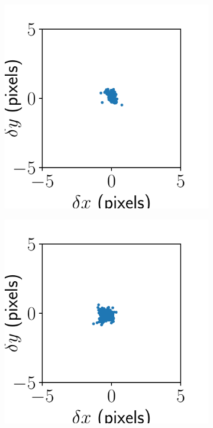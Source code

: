 \documentclass{article}
\begin{document}
\begin{figure}[ht]
\begin{subfigure}{0.24\linewidth}
		\caption{}
		\label{fig:stitchresultAKY3}
	\end{subfigure}
	\begin{subfigure}{0.24\linewidth}
		\includegraphics[width=\linewidth]{stitch-result-AKY-2.pdf}
		\caption{}
		\label{fig:stitchresultAKY2}
	\end{subfigure}
	\begin{subfigure}{0.24\linewidth}
		\includegraphics[width=\linewidth]{stitch-result-AKY-1.pdf}

\end{subfigure}
\end{figure}
\end{document}
